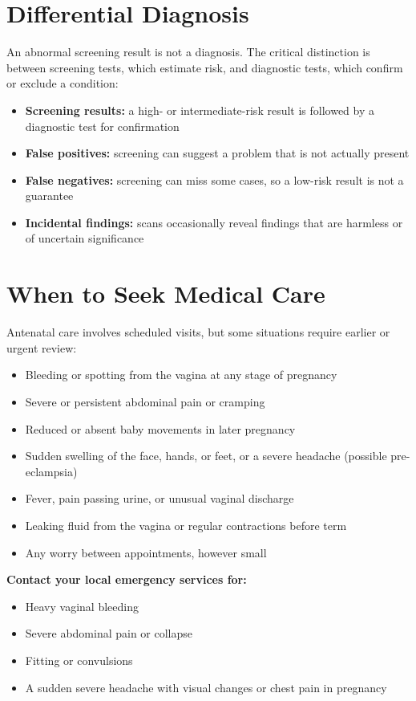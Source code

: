 \section*{Differential Diagnosis}
An abnormal screening result is not a diagnosis. The critical distinction is between screening tests, which estimate risk, and diagnostic tests, which confirm or exclude a condition:

\begin{itemize}
    \item \textbf{Screening results:} a high- or intermediate-risk result is followed by a diagnostic test for confirmation
    \item \textbf{False positives:} screening can suggest a problem that is not actually present
    \item \textbf{False negatives:} screening can miss some cases, so a low-risk result is not a guarantee
    \item \textbf{Incidental findings:} scans occasionally reveal findings that are harmless or of uncertain significance
\end{itemize}

\section*{When to Seek Medical Care}
Antenatal care involves scheduled visits, but some situations require earlier or urgent review:

\begin{itemize}
    \item Bleeding or spotting from the vagina at any stage of pregnancy
    \item Severe or persistent abdominal pain or cramping
    \item Reduced or absent baby movements in later pregnancy
    \item Sudden swelling of the face, hands, or feet, or a severe headache (possible pre-eclampsia)
    \item Fever, pain passing urine, or unusual vaginal discharge
    \item Leaking fluid from the vagina or regular contractions before term
    \item Any worry between appointments, however small
\end{itemize}

\textbf{Contact your local emergency services for:}
\begin{itemize}
    \item Heavy vaginal bleeding
    \item Severe abdominal pain or collapse
    \item Fitting or convulsions
    \item A sudden severe headache with visual changes or chest pain in pregnancy
\end{itemize}

